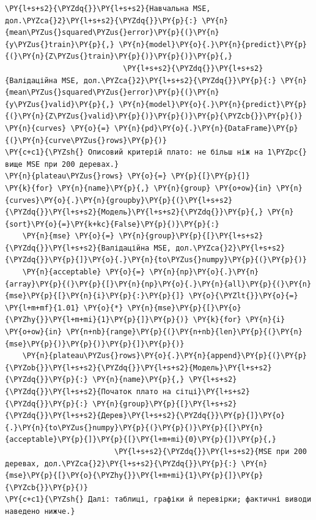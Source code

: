 \begin{Verbatim}[commandchars=\\\{\}]
                           \PY{l+s+s2}{\PYZdq{}}\PY{l+s+s2}{Навчальна MSE, дол.\PYZca{}2}\PY{l+s+s2}{\PYZdq{}}\PY{p}{:} \PY{n}{mean\PYZus{}squared\PYZus{}error}\PY{p}{(}\PY{n}{y\PYZus{}train}\PY{p}{,} \PY{n}{model}\PY{o}{.}\PY{n}{predict}\PY{p}{(}\PY{n}{Z\PYZus{}train}\PY{p}{)}\PY{p}{)}\PY{p}{,}
                           \PY{l+s+s2}{\PYZdq{}}\PY{l+s+s2}{Валідаційна MSE, дол.\PYZca{}2}\PY{l+s+s2}{\PYZdq{}}\PY{p}{:} \PY{n}{mean\PYZus{}squared\PYZus{}error}\PY{p}{(}\PY{n}{y\PYZus{}valid}\PY{p}{,} \PY{n}{model}\PY{o}{.}\PY{n}{predict}\PY{p}{(}\PY{n}{Z\PYZus{}valid}\PY{p}{)}\PY{p}{)}\PY{p}{\PYZcb{}}\PY{p}{)}
\PY{n}{curves} \PY{o}{=} \PY{n}{pd}\PY{o}{.}\PY{n}{DataFrame}\PY{p}{(}\PY{n}{curve\PYZus{}rows}\PY{p}{)}
\PY{c+c1}{\PYZsh{} Описовий критерій плато: не більш ніж на 1\PYZpc{} вище MSE при 200 деревах.}
\PY{n}{plateau\PYZus{}rows} \PY{o}{=} \PY{p}{[}\PY{p}{]}
\PY{k}{for} \PY{n}{name}\PY{p}{,} \PY{n}{group} \PY{o+ow}{in} \PY{n}{curves}\PY{o}{.}\PY{n}{groupby}\PY{p}{(}\PY{l+s+s2}{\PYZdq{}}\PY{l+s+s2}{Модель}\PY{l+s+s2}{\PYZdq{}}\PY{p}{,} \PY{n}{sort}\PY{o}{=}\PY{k+kc}{False}\PY{p}{)}\PY{p}{:}
    \PY{n}{mse} \PY{o}{=} \PY{n}{group}\PY{p}{[}\PY{l+s+s2}{\PYZdq{}}\PY{l+s+s2}{Валідаційна MSE, дол.\PYZca{}2}\PY{l+s+s2}{\PYZdq{}}\PY{p}{]}\PY{o}{.}\PY{n}{to\PYZus{}numpy}\PY{p}{(}\PY{p}{)}
    \PY{n}{acceptable} \PY{o}{=} \PY{n}{np}\PY{o}{.}\PY{n}{array}\PY{p}{(}\PY{p}{[}\PY{n}{np}\PY{o}{.}\PY{n}{all}\PY{p}{(}\PY{n}{mse}\PY{p}{[}\PY{n}{i}\PY{p}{:}\PY{p}{]} \PY{o}{\PYZlt{}}\PY{o}{=} \PY{l+m+mf}{1.01} \PY{o}{*} \PY{n}{mse}\PY{p}{[}\PY{o}{\PYZhy{}}\PY{l+m+mi}{1}\PY{p}{]}\PY{p}{)} \PY{k}{for} \PY{n}{i} \PY{o+ow}{in} \PY{n+nb}{range}\PY{p}{(}\PY{n+nb}{len}\PY{p}{(}\PY{n}{mse}\PY{p}{)}\PY{p}{)}\PY{p}{]}\PY{p}{)}
    \PY{n}{plateau\PYZus{}rows}\PY{o}{.}\PY{n}{append}\PY{p}{(}\PY{p}{\PYZob{}}\PY{l+s+s2}{\PYZdq{}}\PY{l+s+s2}{Модель}\PY{l+s+s2}{\PYZdq{}}\PY{p}{:} \PY{n}{name}\PY{p}{,} \PY{l+s+s2}{\PYZdq{}}\PY{l+s+s2}{Початок плато на сітці}\PY{l+s+s2}{\PYZdq{}}\PY{p}{:} \PY{n}{group}\PY{p}{[}\PY{l+s+s2}{\PYZdq{}}\PY{l+s+s2}{Дерев}\PY{l+s+s2}{\PYZdq{}}\PY{p}{]}\PY{o}{.}\PY{n}{to\PYZus{}numpy}\PY{p}{(}\PY{p}{)}\PY{p}{[}\PY{n}{acceptable}\PY{p}{]}\PY{p}{[}\PY{l+m+mi}{0}\PY{p}{]}\PY{p}{,}
                         \PY{l+s+s2}{\PYZdq{}}\PY{l+s+s2}{MSE при 200 деревах, дол.\PYZca{}2}\PY{l+s+s2}{\PYZdq{}}\PY{p}{:} \PY{n}{mse}\PY{p}{[}\PY{o}{\PYZhy{}}\PY{l+m+mi}{1}\PY{p}{]}\PY{p}{\PYZcb{}}\PY{p}{)}
\PY{c+c1}{\PYZsh{} Далі: таблиці, графіки й перевірки; фактичні виводи наведено нижче.}
\end{Verbatim}
